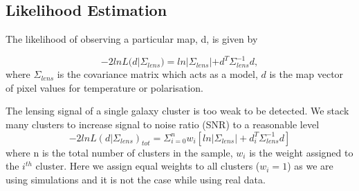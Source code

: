 \subsection*{Likelihood Estimation}
\label{lkhd_est}
  The likelihood of observing a particular map, d, is given by
  
  \begin{equation}
  -2lnL(d|\Sigma_{lens}) = ln |\Sigma_{lens}| + d^{T} \Sigma^{-1}_{lens} d,
  \end{equation}
 where $\Sigma_{lens}$ is the covariance matrix which acts as a model, $d$ is the map vector of pixel values for temperature or polarisation.
  
 The lensing signal of a single galaxy cluster is too weak to be detected. 
  We stack many clusters to increase signal to noise ratio (SNR) to a reasonable level
  \begin{equation}
  -2ln L(d| \Sigma_{lens})_{tot} = \Sigma^{n}_{i =0} w_{i} [ln |\Sigma_{lens}| + d^{T}_{i} \Sigma^{-1}_{lens}  d]
  \end{equation}
  where n is the total number of clusters in the sample, $w_{i}$ is the weight assigned to the $i^{th}$ cluster.
  Here we assign equal weights to all clusters ($w_{i} = 1$) as we are using simulations and it is not the case while using real data. %



